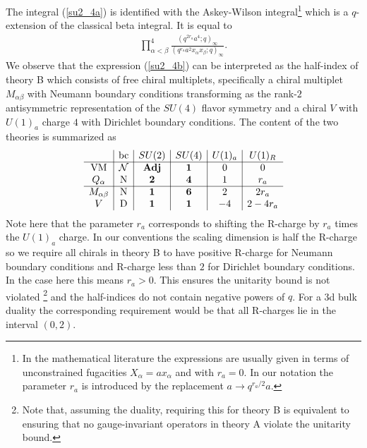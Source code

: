 \documentclass[12pt]{article}
\numberwithin{equation}{section}
\begin{document}
The integral (\ref{su2_4a}) is identified with the Askey-Wilson integral\footnote{In the mathematical literature the expressions are usually given in terms of unconstrained fugacities $X_{\alpha} = a x_{\alpha}$ and with $r_a = 0$. In our notation the parameter $r_a$ is introduced by the replacement $a \rightarrow q^{r_a/2} a$.} \cite{MR783216} 
which is a $q$-extension of the classical beta integral. 
It is equal to 
\begin{align}
\label{su2_4b}
\prod_{\alpha<\beta}^{4}
\frac{(q^{2r_a} a^4;q)_{\infty}}
{(q^{r_a} a^2 x_{\alpha} x_{\beta};q)_{\infty}}. 
\end{align}
We observe that 
the expression (\ref{su2_4b}) can be interpreted as the half-index of 
theory B which consists of free chiral multiplets, specifically
a chiral multiplet $M_{\alpha \beta}$ with Neumann boundary conditions transforming as the rank-$2$ antisymmetric representation of
the $SU(4)$ flavor symmetry and a chiral $V$ with $U(1)_a$ charge $4$ with Dirichlet boundary conditions.
The content of the two theories is summarized as
\begin{align}
\label{SU2_4_charges}
\begin{array}{c|c|c|c|c|c}
& \textrm{bc} & SU(2) & 
SU(4)& U(1)_a & U(1)_R \\ \hline
\textrm{VM} & \mathcal{N} & {\bf Adj} & {\bf 1} & 0 & 0 \\
Q_{\alpha} & \textrm{N} & {\bf 2} & {\bf 4} & 1 & r_a \\
 \hline
M_{\alpha \beta} & \textrm{N} & {\bf 1} & {\bf 6} & 2 & 2r_a \\
V & \textrm{D} & {\bf 1} & {\bf 1} & -4 & 2 - 4r_a
\end{array}
\end{align}
Note here that the parameter $r_a$ corresponds to shifting the R-charge by $r_a$ times the $U(1)_a$ charge. In our conventions the scaling dimension is half the R-charge so we require all chirals in theory B to have positive R-charge for Neumann boundary conditions and R-charge less than $2$ for Dirichlet boundary conditions. In the case here this means $r_a > 0$. This ensures the unitarity bound is not violated
\footnote{Note that, assuming the duality, requiring this for theory B is equivalent to ensuring that no gauge-invariant operators in theory A violate the unitarity bound.}
and the half-indices do not contain negative powers of $q$. For a 3d bulk duality the corresponding requirement would be that all R-charges lie in the interval $(0,2)$.
\end{document}
